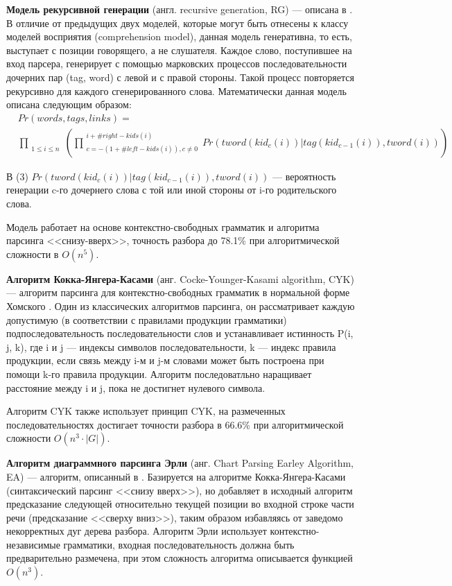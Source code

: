 \textbf{Модель рекурсивной генерации} (англ. recursive generation, RG) --- описана в \cite{eisner}. В отличие от предыдущих двух моделей, которые могут быть отнесены к классу моделей восприятия (comprehension model), данная модель генеративна, то есть, выступает с позиции говорящего, а не слушателя. Каждое слово, поступившее на вход парсера, генерирует с помощью марковских процессов последовательности дочерних пар (tag, word) с левой и с правой стороны. Такой процесс повторяется рекурсивно для каждого сгенерированного слова. Математически данная модель описана следующим образом:
\begin{equation}\begin{split}
	& Pr(words, tags, links) = \\
	& \prod_{\substack{1 \leq i \leq n}} \left( \prod^{\substack{i + \#right-kids(i)}}_{\substack{c = - (1 + \#left-kids(i)), c \neq 0}} Pr(tword(kid_c(i)) | tag(kid_{c - 1}(i)), tword(i)) \right)
\end{split}\end{equation}

В (3) \(Pr(tword(kid_c(i)) | tag(kid_{c - 1}(i)), tword(i))\) --- вероятность генерации c-го дочернего слова с той или иной стороны от i-го родительского слова.

Модель работает на основе контекстно-свободных грамматик и алгоритма парсинга <<снизу-вверх>>, точность разбора до 78.1\% при алгоритмической сложности в \(O(n^5)\).

\textbf{Алгоритм Кокка-Янгера-Касами} (анг. Cocke-Younger-Kasami algorithm, CYK) --- алгоритм парсинга для контекстно-свободных грамматик в нормальной форме Хомского \cite{wiki_cyk}. Один из классических алгоритмов парсинга, он рассматривает каждую допустимую (в соответствии с правилами продукции грамматики) подпоследовательность последовательности слов и устанавливает истинность P(i, j, k), где i и j --- индексы символов последовательности, k --- индекс правила продукции, если связь между i-м и j-м словами может быть построена при помощи k-го правила продукции. Алгоритм последоватльно наращивает расстояние между i и j, пока не достигнет нулевого символа.

Алгоритм CYK также использует принцип CYK, на размеченных последовательностях достигает точности разбора в 66.6\% при алгоритмической сложности \(O(n^3 \cdot |G|)\).

\textbf{Алгоритм диаграммного парсинга Эрли} (анг. Chart Parsing Earley Algorithm, EA) --- алгоритм, описанный в \cite{webbe}. Базируется на алгоритме Кокка-Янгера-Касами (синтаксический парсинг <<снизу вверх>>), но добавляет в исходный алгоритм предсказание следующей относительно текущей позиции во входной строке части речи (предсказание <<сверху вниз>>), таким образом избавляясь от заведомо некорректных дуг дерева разбора. Алгоритм Эрли использует контекстно-независимые грамматики, входная последовательность должна быть предварительно размечена, при этом сложность алгоритма описывается функцией \(O(n^3)\).

